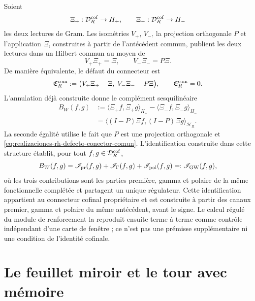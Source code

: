 Soient
\[
 \Xi_+:\mathcal D_R^{\rm cof}\to H_+,
 \qquad
 \Xi_-:\mathcal D_R^{\rm cof}\to H_-
\]
les deux lectures de Gram. Les isométries \(V_+\), \(V_-\), la projection
orthogonale \(P\) et l'application \(\Xi\), construites à partir de l'antécédent commun,
publient les deux lectures dans un Hilbert commun au moyen de
\begin{equation}\label{eq:realizaciones-rh-publicaciones-comunes}
 V_+\Xi_+=\Xi,
 \qquad V_-\Xi_-=P\Xi.
\end{equation}
De manière équivalente, le défaut du connecteur est
\begin{equation}\label{eq:realizaciones-rh-defecto-conector-comun}
 \mathfrak E_R^{\rm com}
 :=\bigl(V_+\Xi_+-\Xi,\;V_-\Xi_--P\Xi\bigr),
 \qquad
 \mathfrak E_R^{\rm com}=0.
\end{equation}
L'annulation déjà construite donne le complément sesquilinéaire
\begin{equation}\label{eq:realizaciones-rh-bw}
 \begin{aligned}
 B_W(f,g)
 &:=\langle\Xi_+f,\Xi_+g\rangle_{H_+}
   -\langle\Xi_-f,\Xi_-g\rangle_{H_-}\\
 &=\langle(I-P)\Xi f,(I-P)\Xi g\rangle_{\mathcal H_R}.
 \end{aligned}
\end{equation}
La seconde égalité utilise le fait que \(P\) est une projection orthogonale et
\eqref{eq:realizaciones-rh-defecto-conector-comun}. L'identification
construite dans cette structure établit, pour tout
\(f,g\in\mathcal D_R^{\rm cof}\),
\begin{equation}\label{eq:realizaciones-rh-identificacion-gw}
 B_W(f,g)=
 \mathscr I_{\rm pr}(f,g)+
 \mathscr I_{\Gamma}(f,g)+
 \mathscr I_{\rm pol}(f,g)
 =:\mathscr I_{\rm GW}(f,g),
\end{equation}
où les trois contributions sont les parties première, gamma et polaire de la même
fonctionnelle complétée et partagent un unique régulateur.
Cette identification appartient au connecteur cofinal propriétaire et est construite
à partir des canaux premier, gamma et polaire du même antécédent, avant le signe.
Le calcul régulé du module de renforcement la reproduit ensuite terme à
terme comme contrôle indépendant d'une carte de fenêtre ; ce n'est pas une prémisse
supplémentaire ni une condition de l'identité cofinale.

\section*{Le feuillet miroir et le tour avec mémoire}

